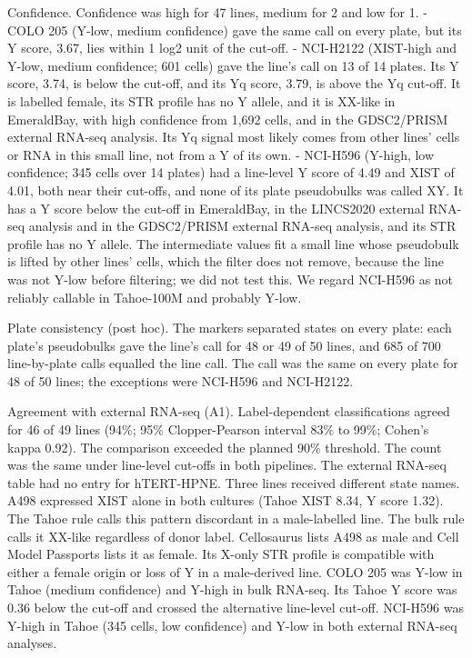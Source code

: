 \documentclass[
  11pt,
  letterpaper,
]{article}
\newcounter{none} %
\begin{document}
Confidence. Confidence was high for 47 lines, medium for 2 and low for
1. - COLO 205 (Y-low, medium confidence) gave the same call on every
plate, but its Y score, 3.67, lies within 1 log2 unit of the cut-off. -
NCI-H2122 (XIST-high and Y-low, medium confidence; 601 cells) gave the
line's call on 13 of 14 plates. Its Y score, 3.74, is below the cut-off,
and its Yq score, 3.79, is above the Yq cut-off. It is labelled female,
its STR profile has no Y allele, and it is XX-like in EmeraldBay, with
high confidence from 1,692 cells, and in the GDSC2/PRISM external
RNA-seq analysis. Its Yq signal most likely comes from other lines'
cells or RNA in this small line, not from a Y of its own. - NCI-H596
(Y-high, low confidence; 345 cells over 14 plates) had a line-level Y
score of 4.49 and XIST of 4.01, both near their cut-offs, and none of
its plate pseudobulks was called XY. It has a Y score below the cut-off
in EmeraldBay, in the LINCS2020 external RNA-seq analysis and in the
GDSC2/PRISM external RNA-seq analysis, and its STR profile has no Y
allele. The intermediate values fit a small line whose pseudobulk is
lifted by other lines' cells, which the filter does not remove, because
the line was not Y-low before filtering; we did not test this. We regard
NCI-H596 as not reliably callable in Tahoe-100M and probably Y-low.

Plate consistency (post hoc). The markers separated states on every
plate: each plate's pseudobulks gave the line's call for 48 or 49 of 50
lines, and 685 of 700 line-by-plate calls equalled the line call. The
call was the same on every plate for 48 of 50 lines; the exceptions were
NCI-H596 and NCI-H2122.

Agreement with external RNA-seq (A1). Label-dependent classifications
agreed for 46 of 49 lines (94\%; 95\% Clopper-Pearson interval 83\% to
99\%; Cohen's kappa 0.92). The comparison exceeded the planned 90\%
threshold. The count was the same under line-level cut-offs in both
pipelines. The external RNA-seq table had no entry for hTERT-HPNE.
Three lines received different state names. A498 expressed XIST alone in
both cultures (Tahoe XIST 8.34, Y score 1.32). The Tahoe rule calls this
pattern discordant in a male-labelled line. The bulk rule calls it XX-like
regardless of donor label. Cellosaurus lists A498 as male and Cell Model
Passports lists it as female. Its X-only STR profile is compatible with
either a female origin or loss of Y in a male-derived line.
COLO 205 was Y-low in Tahoe (medium confidence) and Y-high in bulk
RNA-seq. Its Tahoe Y score was 0.36 below the cut-off and crossed the
alternative line-level cut-off. NCI-H596 was Y-high in Tahoe (345 cells,
low confidence) and Y-low in both external RNA-seq analyses.
\end{document}
